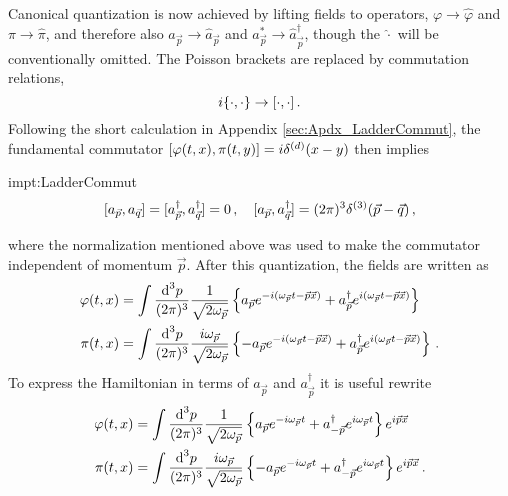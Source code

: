 Canonical quantization is now achieved by lifting fields to operators, $\varphi\to\hat{\varphi}$ and $\pi\to\hat{\pi}$, and therefore also $a_{\vec{p}}\to\hat{a}_{\vec{p}}$ and $a_{\vec{p}}^*\to\hat{a}_{\vec{p}}^\dagger$, though the $\hat{\cdot}$ will be conventionally omitted. The Poisson brackets are replaced by commutation relations,
\begin{equation}
    {i}\{\cdot,\cdot\}\to{[\cdot,\cdot]}\,.
\end{equation}
Following the short calculation in Appendix \ref{sec:Apdx_LadderCommut}, the fundamental commutator ${{[\varphi(t,x),\pi(t,y)]}={i}\delta^{(d)}(x-y)}$ then implies
\begin{impt}{impt:LadderCommut}
    \begin{equation}
        {[a_{\vec{p}},a_{\vec{q}}]}={[a_{\vec{p}}^\dagger,a_{\vec{q}}^\dagger]}=0\,,\quad{[a_{\vec{p}},a_{\vec{q}}^\dagger]}=(2\pi)^3\delta^{(3)}(\vec{p}-\vec{q})\,,
    \end{equation}
\end{impt}
where the normalization mentioned above was used to make the commutator independent of momentum $\vec{p}$. After this quantization, the fields are written as
\begin{subequations}
    \begin{align}
        \varphi(t,x)               & =\int\frac{\text{d} ^3p}{(2\pi)^3}\frac{1}{\sqrt{2\omega_{\vec{p}}}}\left\{a_{\vec{p}}e^{-{i}(\omega_{\vec{p}}t-\vec{p}\vec{x})}+a_{\vec{p}}^\dagger e^{{i}(\omega_{\vec{p}}t-\vec{p}\vec{x})}\right\}                                                 \label{eq:CanonicalQuant_RealScalar}\\
       \pi(t,x) & =\int\frac{\text{d} ^3p}{(2\pi)^3}\frac{{i}\omega_{\vec{p}}}{\sqrt{2\omega_{\vec{p}}}}\left\{-a_{\vec{p}}e^{-{i}(\omega_{\vec{p}}t-\vec{p}\vec{x})}+a_{\vec{p}}^\dagger e^{{i}(\omega_{\vec{p}}t-\vec{p}\vec{x})}\right\}\,.
    \end{align}
\end{subequations}
To express the Hamiltonian in terms of $a_{\vec{p}}$ and $a_{\vec{p}}^\dagger$ it is useful rewrite
\begin{subequations}
    \begin{align}
        \varphi(t,x)               & =\int\frac{\text{d} ^3p}{(2\pi)^3}\frac{1}{\sqrt{2\omega_{\vec{p}}}}\left\{a_{\vec{p}}e^{-{i}\omega_{\vec{p}}t}+a_{-\vec{p}}^\dagger e^{{i}\omega_{\vec{p}}t}\right\}e^{{i}\vec{p}\vec{x}}                                             \\
        \pi(t,x) & =\int\frac{\text{d} ^3p}{(2\pi)^3}\frac{{i}\omega_{\vec{p}}}{\sqrt{2\omega_{\vec{p}}}}\left\{-a_{\vec{p}}e^{-{i}\omega_{\vec{p}}t}+a_{-\vec{p}}^\dagger e^{{i}\omega_{\vec{p}}t}\right\}e^{{i}\vec{p}\vec{x}}\,.
    \end{align}
\end{subequations}
